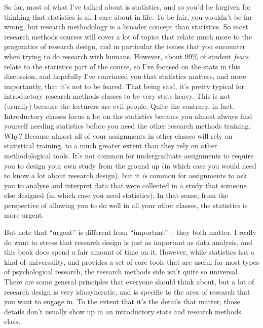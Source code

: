 So far, most of what I've talked about is statistics, and so you'd be forgiven for thinking that statistics is all I care about in life. To be fair, you wouldn't be far wrong, but research methodology is a broader concept than statistics. So most research methods  courses will cover a lot of topics that relate much more to the pragmatics of research design, and in particular the issues that you encounter when trying to do research with humans. However, about 99\% of student {\it fears} relate to the statistics part of the course, so I've focused on the stats in this discussion, and hopefully I've convinced you that statistics matters, and more importantly, that it's not to be feared.  That being said, it's pretty typical for introductory research methods classes to be very stats-heavy. This is not (usually) because the lecturers are evil people. Quite the contrary, in fact. Introductory classes focus a lot on the statistics because you almost always find yourself needing statistics before you need the other research methods training. Why? Because almost all of your assignments in other classes will rely on statistical training, to a much greater extent than they rely on other methodological tools. It's not common for undergraduate  assignments to require you to design your own study from the ground up (in which case you would need to know a lot about research design), but it {\it is} common for assignments to ask you to analyse and interpret data that were collected in a study that someone else designed (in which case you need statistics). In that sense, from the perspective of allowing you to do well in all your other classes, the statistics is more urgent. 

But note that ``urgent'' is different from ``important'' -- they both matter. I really do want to stress that research design is just as important as data analysis, and this book does spend a fair amount of time on it. However, while statistics has a kind of universality, and provides a set of core tools that are useful for most types of psychological research, the research methods side isn't quite so universal. There are some general principles that everyone should think about, but a lot of research design is very idiosyncratic, and is specific to the area of research that you want to engage in. To the extent that it's the details that matter, those details don't usually show up in an introductory stats and research methods class.




